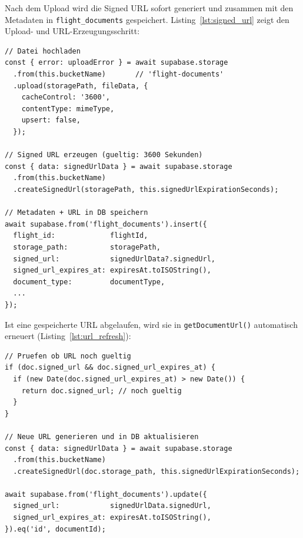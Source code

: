 Nach dem Upload wird die Signed URL sofort generiert und zusammen mit den Metadaten
in \texttt{flight\_documents} gespeichert.
Listing~\ref{lst:signed_url} zeigt den Upload- und URL-Erzeugungsschritt:

\begin{lstlisting}[style=skyline-ts,
  caption={Upload und Signed-URL-Erzeugung (services/documentService.ts)},
  label={lst:signed_url}]
// Datei hochladen
const { error: uploadError } = await supabase.storage
  .from(this.bucketName)       // 'flight-documents'
  .upload(storagePath, fileData, {
    cacheControl: '3600',
    contentType: mimeType,
    upsert: false,
  });

// Signed URL erzeugen (gueltig: 3600 Sekunden)
const { data: signedUrlData } = await supabase.storage
  .from(this.bucketName)
  .createSignedUrl(storagePath, this.signedUrlExpirationSeconds);

// Metadaten + URL in DB speichern
await supabase.from('flight_documents').insert({
  flight_id:             flightId,
  storage_path:          storagePath,
  signed_url:            signedUrlData?.signedUrl,
  signed_url_expires_at: expiresAt.toISOString(),
  document_type:         documentType,
  ...
});
\end{lstlisting}

Ist eine gespeicherte URL abgelaufen, wird sie in \texttt{getDocumentUrl()} automatisch
erneuert (Listing~\ref{lst:url_refresh}):

\begin{lstlisting}[style=skyline-ts,
  caption={Automatischer Signed-URL-Refresh (services/documentService.ts)},
  label={lst:url_refresh}]
// Pruefen ob URL noch gueltig
if (doc.signed_url && doc.signed_url_expires_at) {
  if (new Date(doc.signed_url_expires_at) > new Date()) {
    return doc.signed_url; // noch gueltig
  }
}

// Neue URL generieren und in DB aktualisieren
const { data: signedUrlData } = await supabase.storage
  .from(this.bucketName)
  .createSignedUrl(doc.storage_path, this.signedUrlExpirationSeconds);

await supabase.from('flight_documents').update({
  signed_url:            signedUrlData.signedUrl,
  signed_url_expires_at: expiresAt.toISOString(),
}).eq('id', documentId);
\end{lstlisting}

